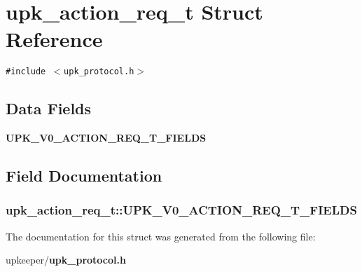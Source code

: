 \section{upk\_\-action\_\-req\_\-t Struct Reference}
\label{structupk__action__req__t}
{\tt \#include $<$upk\_\-protocol.h$>$}

\subsection*{Data Fields}
\begin{CompactItemize}
\item 
\bf{UPK\_\-V0\_\-ACTION\_\-REQ\_\-T\_\-FIELDS}
\end{CompactItemize}


\subsection{Field Documentation}
\subsubsection{\setlength{\rightskip}{0pt plus 5cm}\bf{upk\_\-action\_\-req\_\-t::UPK\_\-V0\_\-ACTION\_\-REQ\_\-T\_\-FIELDS}}\label{structupk__action__req__t_6dad663b132fada3240c11f593bb45d7}




The documentation for this struct was generated from the following file:\begin{CompactItemize}
\item 
upkeeper/\bf{upk\_\-protocol.h}\end{CompactItemize}
